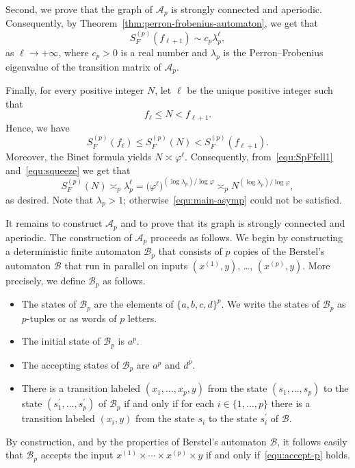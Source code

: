 \documentclass[11pt]{article}
\theoremstyle{remark}\newtheorem{remark}[theorem]{Remark}
\begin{document}
Second, we prove that the graph of $\mathcal{A}_p$ is strongly connected and aperiodic.
Consequently, by Theorem~\ref{thm:perron-frobenius-automaton}, we get that
\begin{equation}\label{equ:SpFfell1}
	S^{(p)}_F(f_{\ell+1}) \sim c_p \lambda_p^\ell ,
\end{equation}
as $\ell \to +\infty$, where $c_p > 0$ is a real number and $\lambda_p$ is the Perron--Frobenius eigenvalue of the transition matrix of $\mathcal{A}_p$.

Finally, for every positive integer $N$, let $\ell$ be the unique positive integer such that
\begin{equation*}
	f_\ell \leq N < f_{\ell + 1} .
\end{equation*}
Hence, we have
\begin{equation}\label{equ:squeeze}
	S^{(p)}_F(f_{\ell}) \leq S^{(p)}_F(N) < S^{(p)}_F(f_{\ell+1}) .
\end{equation}
Moreover, the Binet formula yields $N \asymp \varphi^\ell$.
Consequently, from~\eqref{equ:SpFfell1} and~\eqref{equ:squeeze} we get that
\begin{equation*}
	S^{(p)}_F(N) \asymp_p \lambda_p^\ell = \big(\varphi^\ell\big)^{(\log \lambda_p) / \! \log \varphi} \asymp_p N^{(\log \lambda_p) / \! \log \varphi} ,
\end{equation*}
as desired.
Note that $\lambda_p > 1$; otherwise~\eqref{equ:main-asymp} could not be satisfied.

It remains to construct $\mathcal{A}_p$ and to prove that its graph is strongly connected and aperiodic.
The construction of $\mathcal{A}_p$ proceeds as follows.
We begin by constructing a deterministic finite automaton $\mathcal{B}_p$ that consists of $p$ copies of the Berstel's automaton $\mathcal{B}$ that run in parallel on inputs $(x^{(1)}, y)$, \dots, $(x^{(p)}, y)$.
More precisely, we define $\mathcal{B}_p$ as follows.
\vspace{0.5em}
\begin{itemize}
	\setlength\itemsep{0.5em}
	
	\item The states of $\mathcal{B}_p$ are the elements of $\{a,b,c,d\}^p$.
	We write the states of $\mathcal{B}_p$ as $p$-tuples or as words of $p$ letters.
	
	\item The initial state of $\mathcal{B}_p$ is $a^p$.
	
	\item The accepting states of $\mathcal{B}_p$ are $a^p$ and $d^p$.
	
	\item There is a transition labeled $(x_1, \dots, x_p, y)$ from the state $(s_1, \dots, s_p)$ to the state $(s_1^\prime, \dots, s_p^\prime)$ of $\mathcal{B}_p$ if and only if for each $i \in \{1, \dots, p\}$ there is a transition labeled $(x_i, y)$ from the state $s_i$ to the state $s_i^\prime$ of $\mathcal{B}$.
\end{itemize}
By construction, and by the properties of Berstel's automaton $\mathcal{B}$, it follows easily that $\mathcal{B}_p$ accepts the input $x^{(1)} \times \cdots \times x^{(p)} \times y$ if and only if~\eqref{equ:accept-p} holds.
\end{document}
